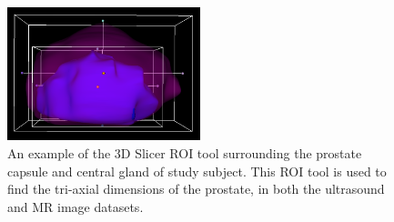 \begin{figure}[htb!]
\centering
\includegraphics[width=0.5\textwidth]{zach/ROI/ROI.png}
\caption{An example of the 3D Slicer ROI tool surrounding the prostate capsule
    and central gland of study subject. This ROI tool is used to find the
    tri-axial dimensions of the prostate, in both the ultrasound and MR image
    datasets.}
\label{fig:roi_tool} 
\end{figure}
